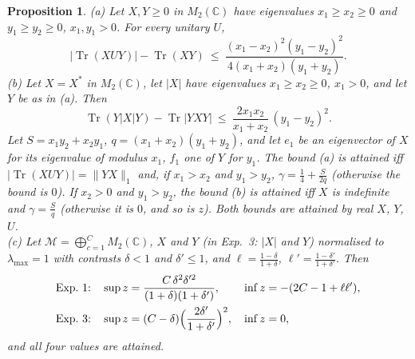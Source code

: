 \documentclass[11pt]{article}
\DeclareMathOperator{\Tr}{Tr}
\newcommand{\C}{\mathbb{C}}
\newcommand{\M}{\mathcal{M}}
\newtheorem{proposition}{Proposition}
\begin{document}
\begin{proposition}\label{prop:k2}
(a) Let $X,Y\ge0$ in $M_2(\C)$ have eigenvalues $x_1\ge x_2\ge0$ and $y_1\ge y_2\ge0$, $x_1,y_1>0$. For every unitary $U$,
\[
  |\Tr(XUY)|-\Tr(XY)\ \le\ \frac{(x_1-x_2)^2(y_1-y_2)^2}{4(x_1+x_2)(y_1+y_2)} .
\]
(b) Let $X=X^*$ in $M_2(\C)$, let $|X|$ have eigenvalues $x_1\ge x_2\ge0$, $x_1>0$, and let $Y$ be as in (a). Then
\[
  \Tr(Y|X|Y)-\Tr|YXY|\ \le\ \frac{2x_1x_2}{x_1+x_2}\,(y_1-y_2)^2 .
\]
Let $S=x_1y_2+x_2y_1$, $q=(x_1+x_2)(y_1+y_2)$, and let $e_1$ be an eigenvector of $X$ for its eigenvalue of modulus $x_1$,
$f_1$ one of $Y$ for $y_1$. The bound (a) is attained iff $|\Tr(XUY)|=\|YX\|_1$ and, if $x_1>x_2$ and $y_1>y_2$,
$\gamma=\frac14+\frac S{2q}$ (otherwise the bound is $0$). If $x_2>0$ and $y_1>y_2$, the bound (b) is attained iff $X$ is
indefinite and $\gamma=\frac Sq$ (otherwise it is $0$, and so is $z$). Both bounds are attained by real $X$, $Y$, $U$.\\
(c) Let $\M=\bigoplus_{c=1}^CM_2(\C)$, $X$ and $Y$ (in Exp.~3: $|X|$ and $Y$) normalised to $\lambda_{\max}=1$ with contrasts
$\delta<1$ and $\delta'\le1$, and $\ell=\frac{1-\delta}{1+\delta}$, $\ell'=\frac{1-\delta'}{1+\delta'}$. Then
\begin{align*}
  \text{Exp.~1:}\quad & \sup z=\frac{C\,\delta^2\delta'^2}{(1+\delta)(1+\delta')}, && \inf z=-(2C-1+\ell\ell'),\\
  \text{Exp.~3:}\quad & \sup z=(C-\delta)\Bigl(\frac{2\delta'}{1+\delta'}\Bigr)^2, && \inf z=0,
\end{align*}
and all four values are attained.
\end{proposition}
\end{document}
